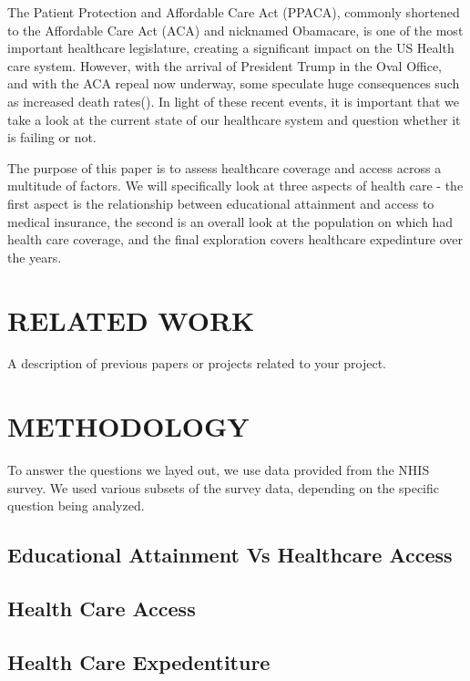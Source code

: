 \documentclass[10pt,]{article}
\begin{document}
The Patient Protection and Affordable Care Act (PPACA), commonly
shortened to the Affordable Care Act (ACA) and nicknamed Obamacare, is
one of the most important healthcare legislature, creating a significant
impact on the US Health care system. However, with the arrival of
President Trump in the Oval Office, and with the ACA repeal now
underway, some speculate huge consequences such as increased death
rates(\citep{trump}). In light of these recent events, it is important
that we take a look at the current state of our healthcare system and
question whether it is failing or not.

The purpose of this paper is to assess healthcare coverage and access
across a multitude of factors. We will specifically look at three
aspects of health care - the first aspect is the relationship between
educational attainment and access to medical insurance, the second is an
overall look at the population on which had health care coverage, and
the final exploration covers healthcare expedinture over the years.

\section{RELATED WORK}\label{related-work}

A description of previous papers or projects related to your project.

\section{METHODOLOGY}\label{methodology}

To answer the questions we layed out, we use data provided from the NHIS
survey. We used various subsets of the survey data, depending on the
specific question being analyzed.

\subsection{\texorpdfstring{\textbf{Educational Attainment Vs Healthcare
Access}}{Educational Attainment Vs Healthcare Access}}\label{educational-attainment-vs-healthcare-access}

\subsection{\texorpdfstring{\textbf{Health Care
Access}}{Health Care Access}}\label{health-care-access}

\subsection{\texorpdfstring{\textbf{Health Care
Expedentiture}}{Health Care Expedentiture}}\label{health-care-expedentiture}
\end{document}
